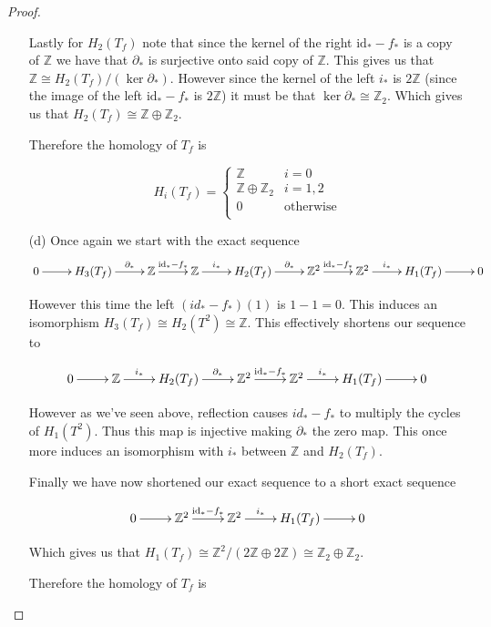 \documentclass[10pt]{article}
\newcommand{\bb}[1]{\mathbb{#1}}
\newcommand{\id}{\mathrm{id}}
\theoremstyle{plain}
\theoremstyle{remark}
\begin{document}
\begin{proof}
\begin{enumerate}
    Lastly for $H_2(T_f)$ note that since the kernel of the right $\id_*-f_*$ is
    a copy of $\bb{Z}$ we have that $\partial_*$ is surjective onto said copy of $\bb{Z}$.
    This gives us that $\bb{Z}\cong H_2(T_f)/(\ker \partial_*)$. However since the kernel of
    the left $i_*$ is $2\bb{Z}$ (since the image of the left $\id_*-f_*$ is $2\bb{Z}$)
    it must be that $\ker \partial_*\cong\bb{Z}_2$. Which gives us that $H_2(T_f)\cong \bb{Z}\oplus\bb{Z}_2$.

    Therefore the homology of $T_f$ is
    
    \[
      H_i(T_f) =
      \left\{
        \begin{array}{cr}
          \bb{Z} & i=0\\
          \bb{Z}\oplus\bb{Z}_2 & i=1,2\\
          0 & \text{otherwise}\\
        \end{array}
      \right.
    \]
  \item[(d)]
    Once again we start with the exact sequence
    \[
      \xymatrix{
        0 \ar[r] & H_3(T_f) \ar[r]^-{\partial_*} & \bb{Z} \ar[r]^-{\id_*-f_*} & \bb{Z} \ar[r]^-{i_*} & H_2(T_f) \ar[r]^-{\partial_*} & \bb{Z}^2 \ar[r]^-{\id_*-f_*} & \bb{Z}^2 \ar[r]^-{i_*} & H_1(T_f) \ar[r] & 0
      }
    \]

    However this time the left $(id_*-f_*)(1)$ is $1-1=0$. This induces
    an isomorphism $H_3(T_f)\cong H_2(T^2)\cong \bb{Z}$. This effectively shortens our sequence
    to

    \[
      \xymatrix{
        0 \ar[r] & \bb{Z} \ar[r]^-{i_*} & H_2(T_f) \ar[r]^-{\partial_*} & \bb{Z}^2 \ar[r]^-{\id_*-f_*} & \bb{Z}^2 \ar[r]^-{i_*} & H_1(T_f) \ar[r] & 0
      }
    \]

    However as we've seen above, reflection causes $id_*-f_*$ to multiply the cycles of $H_1(T^2)$.
    Thus this map is injective making $\partial_*$ the zero map. This once more induces an
    isomorphism with $i_*$ between $\bb{Z}$ and $H_2(T_f)$.

    Finally we have now shortened our exact sequence to a short
    exact sequence
    
    \[
      \xymatrix{
        0 \ar[r] &\bb{Z}^2 \ar[r]^-{\id_*-f_*} & \bb{Z}^2 \ar[r]^-{i_*} & H_1(T_f) \ar[r] & 0
      }
    \]

    Which gives us that $H_1(T_f)\cong \bb{Z}^2/(2\bb{Z}\oplus 2\bb{Z})\cong\bb{Z}_2\oplus\bb{Z}_2$.

    Therefore the homology of $T_f$ is
    

\end{enumerate}
\end{proof}
\end{document}
